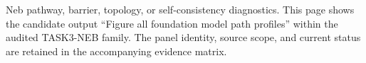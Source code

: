Neb pathway, barrier, topology, or self-consistency diagnostics. This page shows the candidate output ``Figure all foundation model path profiles'' within the audited TASK3-NEB family. The panel identity, source scope, and current status are retained in the accompanying evidence matrix.
